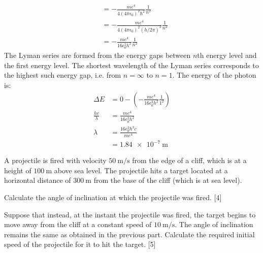 \begin{solution}
\begin{subsolution}
\begin{align*}
            &=-\frac{me^4}{4(4\pi\epsilon_0)^2\hbar^2}\frac{1}{n^2}\\
            &=-\frac{me^4}{4(4\pi\epsilon_0)^2(h/2\pi)^2}\frac{1}{n^2}\\
            &=-\frac{me^4}{16\epsilon_0^2h^2}\frac{1}{n^2}
        \end{align*}
        The Lyman series are formed from the energy gaps between $n$th energy level and the first energy level. The shortest wavelength of the Lyman series corresponds to the highest such energy gap, i.e. from $n=\infty$ to $n=1$. The energy of the photon is:
        \begin{align*}
            \Delta E&=0-\left(-\frac{me^4}{16\epsilon_0^2h^2}\frac{1}{1^2}\right)\\
            \frac{hc}{\lambda}&=\frac{me^4}{16\epsilon_0^2h^2}\\
            \lambda&=\frac{16\epsilon_0^2h^3c}{me^4}\\
            &=\boxed{\qty{1.84e-7}{\m}}
        \end{align*}
    \end{subsolution}
\end{solution}

\begin{problem}
    A projectile is fired with velocity $\qty{50}{\m\per\s}$ from the edge of a cliff, which is at a height of $\qty{100}{\m}$ above sea level. The projectile hits a target located at a horizontal distance of $\qty{300}{\m}$ from the base of the cliff (which is at sea level).
    \begin{subproblem}
        Calculate the angle of inclination at which the projectile was fired.
    \hfill{[4]}\end{subproblem}
    \begin{subproblem}
        Suppose that instead, at the instant the projectile was fired, the target begins to move away from the cliff at a constant speed of $\qty{10}{\m\per\s}$. The angle of inclination remains the same as obtained in the previous part. Calculate the required initial speed of the projectile for it to hit the target.
    \hfill{[5]}\end{subproblem}
\end{problem}

